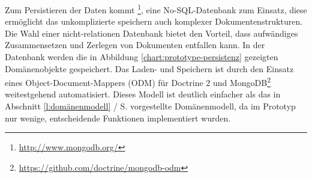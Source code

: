 \bigskip

Zum Persistieren der Daten kommt \footnote{\url{http://www.mongodb.org/}}, eine No-SQL-Datenbank zum Einsatz, diese ermöglicht das unkomplizierte speichern auch komplexer Dokumentenstrukturen. Die Wahl einer nicht-relationen Datenbank bietet den Vorteil, dass aufwändiges Zusammensetzen und Zerlegen von Dokumenten entfallen kann. In der Datenbank werden die in Abbildung \ref{chart:prototype-persistenz} gezeigten Domänenobjekte gespeichert. Das Laden- und Speichern ist durch den Einsatz eines Object-Document-Mappers (ODM) für Doctrine 2 und MongoDB\footnote{\url{https://github.com/doctrine/mongodb-odm}} weitestgehend automatisiert. Dieses Modell ist deutlich einfacher als das in Abschnitt \ref{l:domänenmodell} / S.\pageref{l:domänenmodell} vorgestellte Domänenmodell, da im Prototyp nur wenige, entscheidende Funktionen implementiert wurden.

